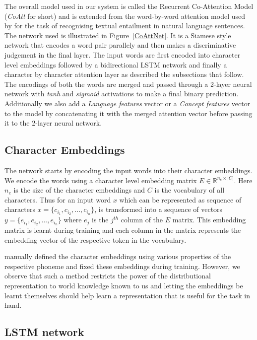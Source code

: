 \documentclass[11pt,letterpaper]{article}
\begin{document}
The overall model used in our system is called the Recurrent Co-Attention Model (\textit{CoAtt} for short) and is extended from the word-by-word attention model used by \cite{rocktaschel2016reasoning} for the task of recognising textual entailment in natural language sentences. The network used is illustrated in Figure~\ref{CoAttNet}. It is a Siamese style network that encodes a word pair parallely and then makes a discriminative judgement in the final layer. The input words are first encoded into character level embeddings followed by a bidirectional LSTM network and finally a character by character attention layer as described the subsections that follow. The encodings of both the words are merged and passed through a 2-layer neural network with \textit{tanh} and \textit{sigmoid} activations to make a final binary prediction. Additionally we also add a \textit{Language features} vector or a \textit{Concept features} vector to the model by concatenating it with the merged attention vector before passing it to the 2-layer neural network.

\subsection{Character Embeddings}

The network starts by encoding the input words into their character embeddings. We encode the words using a character level embedding matrix $E \in \mathbb{R}^{n_e \times |C|}$. Here $n_e$ is the size of the character embeddings and $C$ is the vocabulary of all characters. Thus for an input word $x$ which can be represented as sequence of characters $x = \{c_{i_1}, c_{i_2}, ..., c_{i_n}\}$, is transformed into a sequence of vectors $y = \{e_{i_1}, e_{i_2}, ..., e_{i_n}\}$ where $e_j$ is the $j^{th}$ column of the $E$ matrix. This embedding matrix is learnt during training and each column in the matrix represents the embedding vector of the respective token in the vocabulary. 

\cite{rama2016siamese} manually defined the character embeddings using various properties of the respective phoneme and fixed these embeddings during training. However, we observe that such a method restricts the power of the distributional representation to world knowledge known to us and letting the embeddings be learnt themselves should help learn a representation that is useful for the task in hand.

\subsection{LSTM network}
\end{document}
